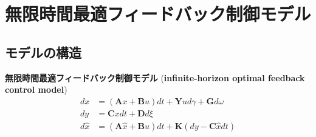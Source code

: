 \section{無限時間最適フィードバック制御モデル}
\subsection{モデルの構造}
\textbf{無限時間最適フィードバック制御モデル} (\textbf{infinite-horizon optimal feedback control model}) \citep{Qian2013-zy}
\begin{align}
d x&=(\mathbf{A} x+\mathbf{B} u) dt +\mathbf{Y} u d \gamma+\mathbf{G} d \omega \\
d y&=\mathbf{C} x dt+\mathbf{D} d \xi\\
d \hat{x}&=(\mathbf{A} \hat{x}+\mathbf{B} u) dt+\mathbf{K}(dy-\mathbf{C} \hat{x} dt)
\end{align}
